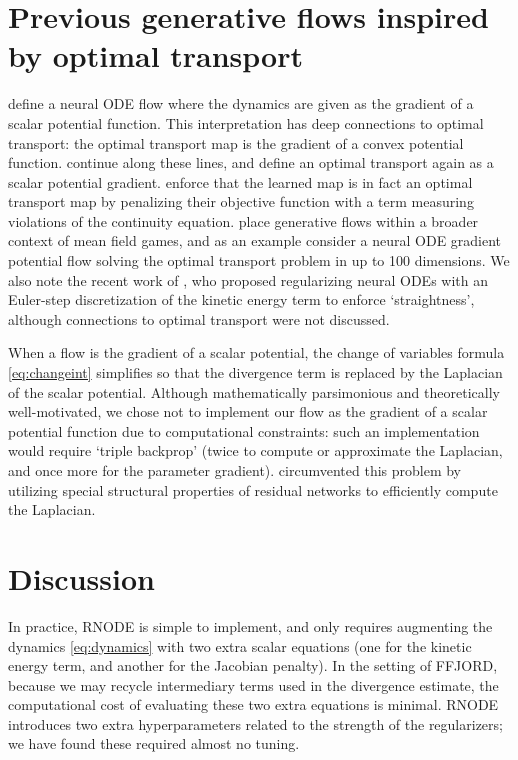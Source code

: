 \documentclass{article}
\theoremstyle{definition}
\theoremstyle{remark}
\begin{document}
\section{Previous generative flows inspired by optimal transport}
\citet{zhang2019mongeampere} define a neural ODE flow where the dynamics
  are given as the gradient of a scalar potential function. This interpretation
  has deep connections to optimal transport: the optimal transport map
  is the gradient of a convex potential function. 
  \citet{yang19} continue along these lines, and define an optimal transport
  again as a scalar potential gradient. \citet{yang19} enforce that the learned
  map is in fact an optimal transport map by penalizing their objective function with a term measuring
  violations of the continuity equation. 
\citet{ruthotto19} place generative flows within a broader context of mean field
games, and as an example consider a neural ODE gradient potential flow solving the optimal transport problem
in up to 100 dimensions. We also note the recent work of \citet{twomey19}, who proposed regularizing
neural ODEs with an Euler-step discretization of the kinetic energy term to
enforce `straightness', although connections to optimal transport were not
discussed. 

When a flow is the gradient of a scalar potential, the
change of variables formula \eqref{eq:changeint} simplifies so that the
divergence term is replaced by the Laplacian of the scalar potential.
Although mathematically parsimonious and theoretically well-motivated,
we chose not to implement our flow as the gradient of a scalar
potential function due to computational constraints: such an implementation
would require `triple  backprop' (twice
to compute or approximate the Laplacian, and once more for the parameter gradient).
\citet{ruthotto19} circumvented this problem by utilizing special structural
properties of residual networks to efficiently compute the Laplacian.

\section{Discussion}
In practice, RNODE is simple to implement, and only requires augmenting the
dynamics \eqref{eq:dynamics} with two extra scalar equations (one for the
kinetic energy term, and another for the Jacobian penalty). In the setting of
FFJORD, because we may recycle intermediary terms used in the divergence
estimate, the computational cost of evaluating these two extra equations is
minimal. RNODE introduces two extra hyperparameters related to the strength
of the regularizers; we have found these required almost no tuning.
\end{document}
